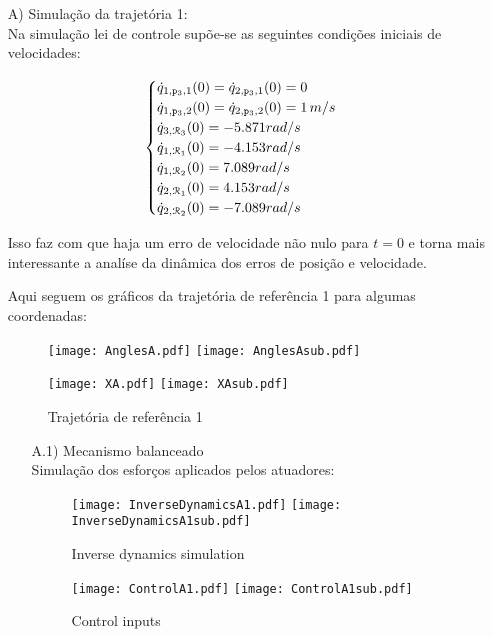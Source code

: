 \begin{itemize}
\item[A)] Simula\c{c}\~ao da trajet\'oria 1: \\

Na simula\c{c}\~ao lei de controle sup\~oe-se as seguintes condi\c{c}\~oes iniciais de velocidades:

$$\begin{cases}
\dot{q}_{1,\mathtt{p}_3,1}(0) = \dot{q}_{2,\mathtt{p}_3,1}(0) = 0 \\
\dot{q}_{1,\mathtt{p}_3,2}(0) = \dot{q}_{2,\mathtt{p}_3,2}(0) = 1 \,m/s \\
\dot{q}_{3, \mathcal{R}_3}(0) = -5.871 rad/s \\
\dot{q}_{1,\mathcal{R}_1}(0) = -4.153 rad/s \\
\dot{q}_{1,\mathcal{R}_2}(0) = 7.089 rad/s \\
\dot{q}_{2,\mathcal{R}_1}(0) = 4.153 rad/s \\
\dot{q}_{2,\mathcal{R}_2}(0) = -7.089 rad/s \\
\end{cases}$$

Isso faz com que haja um erro de velocidade n\~ao nulo para $t=0$ e torna mais interessante a anal\'ise da din\^amica dos erros de posi\c{c}\~ao e velocidade.

Aqui seguem os gr\'aficos da trajet\'oria de refer\^encia 1 para algumas coordenadas:

\begin{figure}[ht]
\centering
\begin{minipage}[b]{0.45\linewidth}
\texttt{[image: AnglesA.pdf]}
\texttt{[image: AnglesAsub.pdf]}
\label{fig:AnglesA}
\end{minipage}
\quad
\begin{minipage}[b]{0.45\linewidth}
\texttt{[image: XA.pdf]}
\texttt{[image: XAsub.pdf]}
\label{fig:XA}
\end{minipage}
\caption{Trajet\'oria de refer\^encia 1}
\end{figure}

\begin{itemize}
\item[A.1)] Mecanismo balanceado \\

Simula\c{c}\~ao dos esfor\c{c}os aplicados pelos atuadores:

\begin{figure}[H]
\centering
\begin{minipage}[b]{0.45\linewidth}
\texttt{[image: InverseDynamicsA1.pdf]}
\texttt{[image: InverseDynamicsA1sub.pdf]}
\label{fig:InverseDynamicsA1}
\caption{Inverse dynamics simulation}
\end{minipage}
\quad
\begin{minipage}[b]{0.45\linewidth}
\texttt{[image: ControlA1.pdf]}
\texttt{[image: ControlA1sub.pdf]}
\label{fig:ControlA1}
\caption{Control inputs}
\end{minipage}
\end{figure}


\end{itemize}
\end{itemize}
